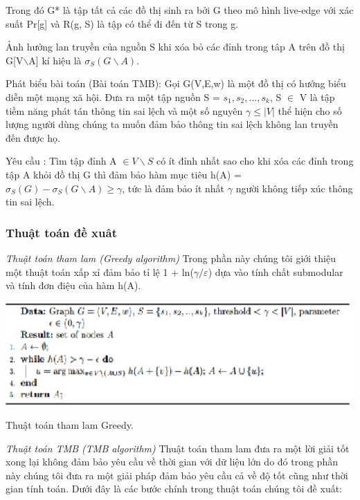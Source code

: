 		Trong đó G* là tập tất cả các đồ thị sinh ra bởi G theo mô hình live-edge với xác suất Pr[g] và R(g, S) là tập có thể đi đến từ S trong g.
		
		Ảnh hưởng lan truyền của nguồn S khi xóa bỏ các đỉnh trong tâp A trên đồ thị G[V$\backslash$A] kí hiệu là $\sigma_{S}(G \backslash A)$.
		
		Phát biểu bài toán (Bài toán TMB): Gọi G(V,E,w) là một đồ thị có hướng biểu diễn một mạng xã hội. Đưa ra một tập nguồn S = {$s_{1}, s_{2}, ... , s_{k}$}, S $\in$ V là tập tiềm năng phát tán thông tin sai lệch và một số nguyên $\gamma \leq | V |$ thể hiện cho số lượng người dùng chúng ta muốn đảm bảo thông tin sai lệch không lan truyền đến được họ.
		
		Yêu cầu : Tìm tập đỉnh A $\in V \backslash S$ có ít đỉnh nhất sao cho khi xóa các đỉnh trong tập A khỏi đồ thị G thì đảm bảo hàm mục tiêu h(A) = $\sigma_{S}(G) - \sigma_{S}(G \backslash A) \geq \gamma$, tức là đảm bảo ít nhất $\gamma$ người không tiếp xúc thông tin sai lệch.
		
		\subsubsection{Thuật toán đề xuât}
		{\itshape Thuật toán tham lam (Greedy algorithm)}
		Trong phần này chúng tôi giới thiệu một thuật toán xấp xỉ đảm bảo tỉ lệ 1 + ln($\gamma / \varepsilon$) dựa vào tính chất submodular và tính đơn điệu của hàm h(A).
		\begin{center}
			\includegraphics[scale=.85]{picture/thamlam}
			
			Thuật toán tham lam Greedy.
		\end{center}
 		
		{\itshape Thuật toán TMB (TMB algorithm)}
		Thuật toán tham lam đưa ra một lời giải tốt xong lại không đảm bảo yêu cầu về thời gian với dữ liệu lớn do đó trong phần này chúng tôi đưa ra một giải pháp đảm bảo yêu cầu cả về độ tốt cũng như thời gian tính toán. Dưới đây là các bước chính trong thuật toán chúng tôi đề xuất:
		
